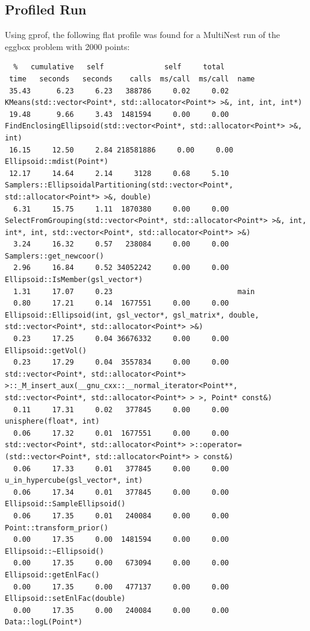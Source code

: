 \documentclass{article}
\begin{document}
\subsection{Profiled Run}
Using gprof, the following flat profile was found for a MultiNest run of the eggbox problem with 2000 points:

\begin{verbatim}
  %   cumulative   self              self     total           
 time   seconds   seconds    calls  ms/call  ms/call  name    
 35.43      6.23     6.23   388786     0.02     0.02  KMeans(std::vector<Point*, std::allocator<Point*> >&, int, int, int*)
 19.48      9.66     3.43  1481594     0.00     0.00  FindEnclosingEllipsoid(std::vector<Point*, std::allocator<Point*> >&, int)
 16.15     12.50     2.84 218581886     0.00     0.00  Ellipsoid::mdist(Point*)
 12.17     14.64     2.14     3128     0.68     5.10  Samplers::EllipsoidalPartitioning(std::vector<Point*, std::allocator<Point*> >&, double)
  6.31     15.75     1.11  1870380     0.00     0.00  SelectFromGrouping(std::vector<Point*, std::allocator<Point*> >&, int, int*, int, std::vector<Point*, std::allocator<Point*> >&)
  3.24     16.32     0.57   238084     0.00     0.00  Samplers::get_newcoor()
  2.96     16.84     0.52 34052242     0.00     0.00  Ellipsoid::IsMember(gsl_vector*)
  1.31     17.07     0.23                             main
  0.80     17.21     0.14  1677551     0.00     0.00  Ellipsoid::Ellipsoid(int, gsl_vector*, gsl_matrix*, double, std::vector<Point*, std::allocator<Point*> >&)
  0.23     17.25     0.04 36676332     0.00     0.00  Ellipsoid::getVol()
  0.23     17.29     0.04  3557834     0.00     0.00  std::vector<Point*, std::allocator<Point*> >::_M_insert_aux(__gnu_cxx::__normal_iterator<Point**, std::vector<Point*, std::allocator<Point*> > >, Point* const&)
  0.11     17.31     0.02   377845     0.00     0.00  unisphere(float*, int)
  0.06     17.32     0.01  1677551     0.00     0.00  std::vector<Point*, std::allocator<Point*> >::operator=(std::vector<Point*, std::allocator<Point*> > const&)
  0.06     17.33     0.01   377845     0.00     0.00  u_in_hypercube(gsl_vector*, int)
  0.06     17.34     0.01   377845     0.00     0.00  Ellipsoid::SampleEllipsoid()
  0.06     17.35     0.01   240084     0.00     0.00  Point::transform_prior()
  0.00     17.35     0.00  1481594     0.00     0.00  Ellipsoid::~Ellipsoid()
  0.00     17.35     0.00   673094     0.00     0.00  Ellipsoid::getEnlFac()
  0.00     17.35     0.00   477137     0.00     0.00  Ellipsoid::setEnlFac(double)
  0.00     17.35     0.00   240084     0.00     0.00  Data::logL(Point*)

\end{verbatim}
\end{document}
